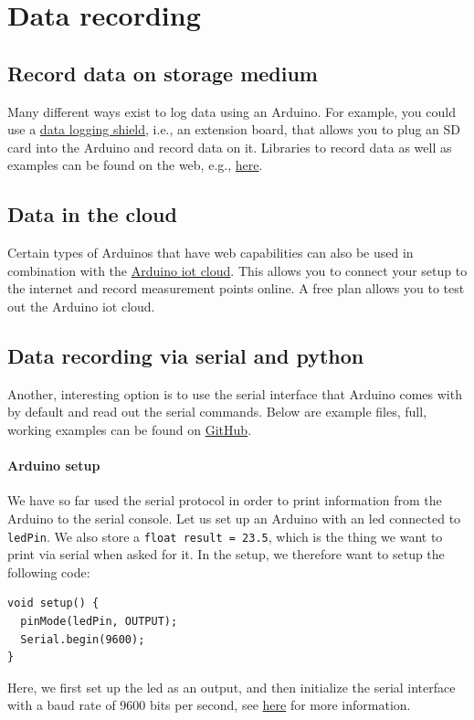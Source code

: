 \section{Data recording}

\subsection{Record data on storage medium}

Many different ways exist to log data using an Arduino. For example, you could use a \href{https://www.arrow.com/en/products/1141/adafruit-industries}{data logging shield}, i.e., an extension board, that allows you to plug an SD card into the Arduino and record data on it. Libraries to record data as well as examples can be found on the web, e.g., \href{https://www.arrow.com/en/research-and-events/articles/data-logging-with-arduino-tutorial}{here}.

\subsection{Data in the cloud}

Certain types of Arduinos that have web capabilities can also be used in combination with the \href{https://docs.arduino.cc/cloud/iot-cloud}{Arduino \ac{iot} cloud}. This allows you to connect your setup to the internet and record measurement points online. A free plan allows you to test out the Arduino \ac{iot} cloud. 

\subsection{Data recording via serial and python}

Another, interesting option is to use the serial interface that Arduino comes with by default and read out the serial commands. Below are example files, full, working examples can be found on \href{https://github.com/galactic-forensics/workshop_arduino_electronics/tree/main/further_examples/data_logger}{GitHub}. 

\paragraph{Arduino setup} We have so far used the serial protocol in order to print information from the Arduino to the serial console. Let us set up an Arduino with an \ac{led} connected to \lstinline{ledPin}. We also store a \lstinline{float result = 23.5}, which is the thing we want to print via serial when asked for it. In the setup, we therefore want to setup the following code:
\begin{lstlisting}
void setup() {
  pinMode(ledPin, OUTPUT);
  Serial.begin(9600);
}
\end{lstlisting}
Here, we first set up the \ac{led} as an output, and then initialize the serial interface with a baud rate of 9600 bits per second, see \href{https://www.arduino.cc/en/Serial.Begin}{here} for more information.

